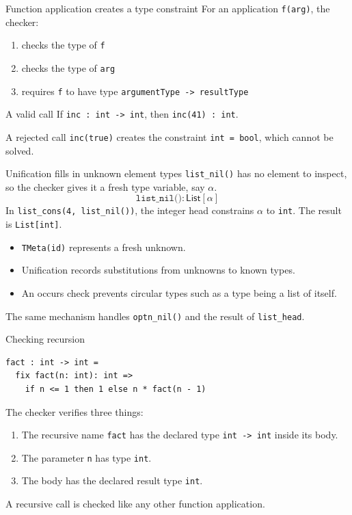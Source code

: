 \documentclass[aspectratio=169,11pt]{beamer}
\begin{document}
\begin{frame}{Function application creates a type constraint}
For an application \texttt{f(arg)}, the checker:
\begin{enumerate}
  \item checks the type of \texttt{f}
  \item checks the type of \texttt{arg}
  \item requires \texttt{f} to have type \texttt{argumentType -> resultType}
\end{enumerate}
\begin{exampleblock}{A valid call}
If \texttt{inc : int -> int}, then \texttt{inc(41) : int}.
\end{exampleblock}
\begin{alertblock}{A rejected call}
\texttt{inc(true)} creates the constraint \texttt{int = bool}, which cannot be solved.
\end{alertblock}
\end{frame}

\begin{frame}{Unification fills in unknown element types}
\texttt{list\_nil()} has no element to inspect, so the checker gives it a fresh type variable, say $\alpha$.
\[
\texttt{list\_nil()} : \mathsf{List}[\alpha]
\]
In \texttt{list\_cons(4, list\_nil())}, the integer head constrains $\alpha$ to \texttt{int}. The result is \texttt{List[int]}.
\begin{itemize}
  \item \texttt{TMeta(id)} represents a fresh unknown.
  \item Unification records substitutions from unknowns to known types.
  \item An occurs check prevents circular types such as a type being a list of itself.
\end{itemize}
The same mechanism handles \texttt{optn\_nil()} and the result of \texttt{list\_head}.
\end{frame}

\begin{frame}[fragile]{Checking recursion}
\begin{lstlisting}
fact : int -> int =
  fix fact(n: int): int =>
    if n <= 1 then 1 else n * fact(n - 1)
\end{lstlisting}
The checker verifies three things:
\begin{enumerate}
  \item The recursive name \texttt{fact} has the declared type \texttt{int -> int} inside its body.
  \item The parameter \texttt{n} has type \texttt{int}.
  \item The body has the declared result type \texttt{int}.
\end{enumerate}
A recursive call is checked like any other function application.
\end{frame}
\end{document}
